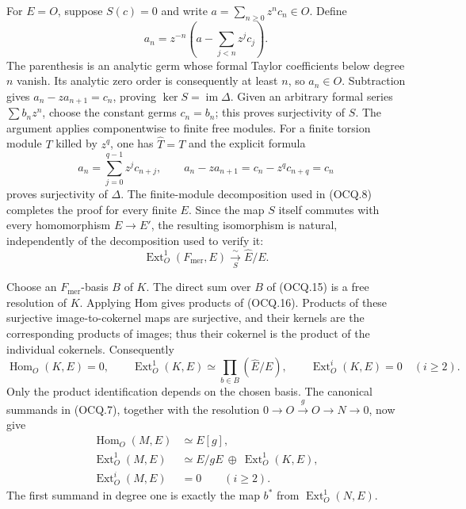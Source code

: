 For $E=O$, suppose $S(c)=0$ and write
$a=\sum_{n\ge0}z^nc_n\in O$.  Define
\[
 a_n=z^{-n}\left(a-\sum_{j<n}z^jc_j\right).                  \tag{OCQ.18}
\]
The parenthesis is an analytic germ whose formal Taylor coefficients
below degree $n$ vanish.  Its analytic zero order is consequently at
least $n$, so $a_n\in O$.  Subtraction gives
$a_n-za_{n+1}=c_n$, proving $\ker S=\operatorname{im}\Delta$.
Given an arbitrary formal series $\sum b_nz^n$, choose the constant
germs $c_n=b_n$; this proves surjectivity of $S$.  The argument applies
componentwise to finite free modules.  For a finite torsion module
$T$ killed by $z^q$, one has $\widehat T=T$ and the explicit formula
\[
 a_n=\sum_{j=0}^{q-1}z^jc_{n+j},\qquad
 a_n-za_{n+1}=c_n-z^qc_{n+q}=c_n                             \tag{OCQ.19}
\]
proves surjectivity of $\Delta$.  The finite-module decomposition used
in (OCQ.8) completes the proof for every finite $E$.  Since the map
$S$ itself commutes with every homomorphism $E\to E'$, the resulting
isomorphism is natural, independently of the decomposition used to
verify it:
\[
 \operatorname{Ext}^1_O(F_{\mathrm{mer}},E)
    \xrightarrow[\ S\ ]{\sim}\widehat E/E.                  \tag{OCQ.20}
\]

Choose an $F_{\mathrm{mer}}$-basis $B$ of $K$.  The direct sum over $B$
of (OCQ.15) is a free resolution of $K$.  Applying Hom gives products
of (OCQ.16).  Products of these surjective image-to-cokernel maps are
surjective, and their kernels are the corresponding products of images;
thus their cokernel is the product of the individual cokernels.
Consequently
\[
 \operatorname{Hom}_O(K,E)=0,\qquad
 \operatorname{Ext}^1_O(K,E)\simeq
       \prod_{b\in B}(\widehat E/E),\qquad
 \operatorname{Ext}^i_O(K,E)=0\quad(i\ge2).                   \tag{OCQ.21}
\]
Only the product identification depends on the chosen basis.
The canonical summands in (OCQ.7), together with the resolution
$0\to O\xrightarrow{g}O\to N\to0$, now give
\[
\begin{split}
 \operatorname{Hom}_O(M,E)&\simeq E[g],\\
 \operatorname{Ext}^1_O(M,E)&\simeq
       E/gE\ \oplus\ \operatorname{Ext}^1_O(K,E),\\
 \operatorname{Ext}^i_O(M,E)&=0\qquad(i\ge2).
\end{split}                                                   \tag{OCQ.22}
\]
The first summand in degree one is exactly the map $b^*$ from
$\operatorname{Ext}^1_O(N,E)$.

